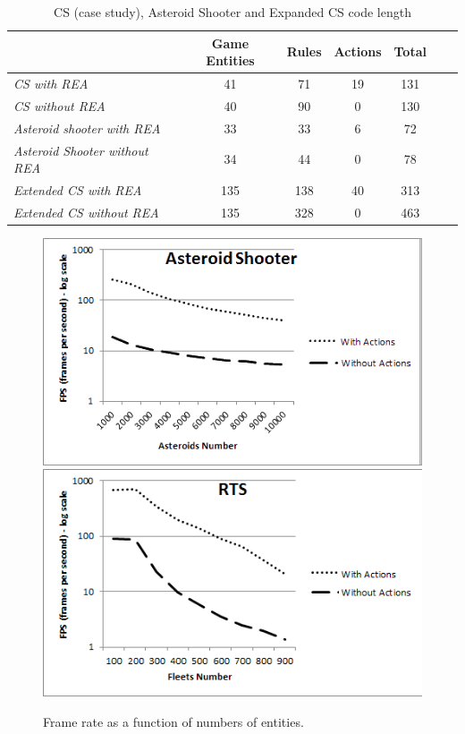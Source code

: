 \begin{table}
\centering
\caption{CS (case study), Asteroid Shooter and Expanded CS code length}
\label{tab:code_length}
\begin{tabular}
{|l|c|c|c|c|c|c|}
\hline
& Game Entities & Rules & Actions & Total\\
\hline
\textit{CS with REA} & 41 & 71 & 19 & 131\\
\hline
\textit{CS without REA} & 40 & 90 & 0 & 130\\
\hline
\textit{Asteroid shooter with REA} & 33 & 33 & 6 & 72\\
\hline
\textit{Asteroid Shooter without REA} & 34 & 44 & 0 & 78\\
\hline
\textit{Extended CS with REA} & 135 & 138 & 40 & 313\\
\hline
\textit{Extended CS without REA} & 135 & 328 & 0 & 463\\
\hline
\end{tabular}
\end{table}
\begin{figure}
\centering
\includegraphics[scale=0.7]{Shooter.png}
\includegraphics[scale=0.7]{RTS.png}
\caption{Frame rate as a function of numbers of entities.}
\label{fps_chart}
\end{figure} 